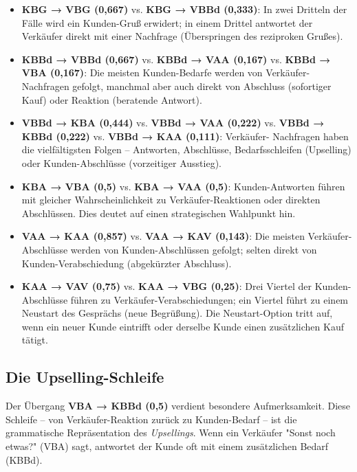 \documentclass[12pt,a4paper]{article}
\begin{document}
\begin{itemize}
    \item \textbf{KBG → VBG (0,667)} vs. \textbf{KBG → VBBd (0,333)}: In zwei
    Dritteln der Fälle wird ein Kunden-Gruß erwidert; in einem Drittel antwortet
    der Verkäufer direkt mit einer Nachfrage (Überspringen des reziproken Grußes).
    
    \item \textbf{KBBd → VBBd (0,667)} vs. \textbf{KBBd → VAA (0,167)} vs.
    \textbf{KBBd → VBA (0,167)}: Die meisten Kunden-Bedarfe werden von
    Verkäufer-Nachfragen gefolgt, manchmal aber auch direkt von Abschluss
    (sofortiger Kauf) oder Reaktion (beratende Antwort).
    
    \item \textbf{VBBd → KBA (0,444)} vs. \textbf{VBBd → VAA (0,222)} vs.
    \textbf{VBBd → KBBd (0,222)} vs. \textbf{VBBd → KAA (0,111)}: Verkäufer-
    Nachfragen haben die vielfältigsten Folgen – Antworten, Abschlüsse,
    Bedarfsschleifen (Upselling) oder Kunden-Abschlüsse (vorzeitiger Ausstieg).
    
    \item \textbf{KBA → VBA (0,5)} vs. \textbf{KBA → VAA (0,5)}: Kunden-Antworten
    führen mit gleicher Wahrscheinlichkeit zu Verkäufer-Reaktionen oder direkten
    Abschlüssen. Dies deutet auf einen strategischen Wahlpunkt hin.
    
    \item \textbf{VAA → KAA (0,857)} vs. \textbf{VAA → KAV (0,143)}: Die meisten
    Verkäufer-Abschlüsse werden von Kunden-Abschlüssen gefolgt; selten direkt
    von Kunden-Verabschiedung (abgekürzter Abschluss).
    
    \item \textbf{KAA → VAV (0,75)} vs. \textbf{KAA → VBG (0,25)}: Drei Viertel
    der Kunden-Abschlüsse führen zu Verkäufer-Verabschiedungen; ein Viertel
    führt zu einem Neustart des Gesprächs (neue Begrüßung). Die Neustart-Option
    tritt auf, wenn ein neuer Kunde eintrifft oder derselbe Kunde einen
    zusätzlichen Kauf tätigt.
\end{itemize}

\subsection{Die Upselling-Schleife}

Der Übergang \textbf{VBA → KBBd (0,5)} verdient besondere Aufmerksamkeit.
Diese Schleife – von Verkäufer-Reaktion zurück zu Kunden-Bedarf – ist die
grammatische Repräsentation des \textit{Upsellings}. Wenn ein Verkäufer
"Sonst noch etwas?" (VBA) sagt, antwortet der Kunde oft mit einem zusätzlichen
Bedarf (KBBd).
\end{document}
